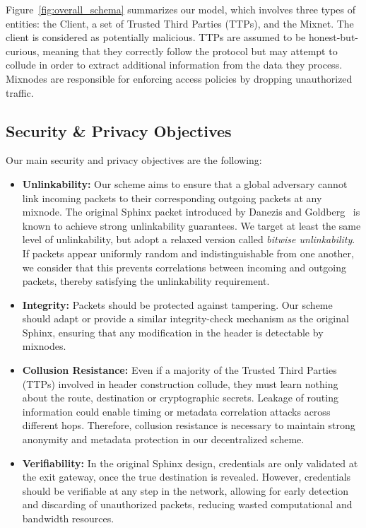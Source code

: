 Figure~\ref{fig:overall_schema} summarizes our model, which involves three types of entities: the Client, a set of Trusted Third Parties (TTPs), and the Mixnet.
The client is considered as potentially malicious.
TTPs are assumed to be honest-but-curious, meaning that they correctly follow the protocol but may attempt to collude in order to extract additional information from the data they process.
Mixnodes are responsible for enforcing access policies by dropping unauthorized traffic.

\subsection{Security \& Privacy Objectives}
\label{sec:sp-objectives}

Our main security and privacy objectives are the following:
\begin{itemize}
        \item \textbf{Unlinkability:} Our scheme aims to ensure that a global adversary cannot link incoming packets to their corresponding outgoing packets at any mixnode.
        The original Sphinx packet introduced by Danezis and Goldberg~\cite{sphinx} is known to achieve strong unlinkability guarantees.
        We target at least the same level of unlinkability, but adopt a relaxed version called \textit{bitwise unlinkability}.
        If packets appear uniformly random and indistinguishable from one another, we consider that this prevents correlations between incoming and outgoing packets, thereby satisfying the unlinkability requirement.

        \item \textbf{Integrity:} Packets should be protected against tampering.
        Our scheme should adapt or provide a similar integrity-check mechanism as the original Sphinx, ensuring that any modification in the header is detectable by mixnodes.

        \item \textbf{Collusion Resistance:} Even if a majority of the Trusted Third Parties (TTPs) involved in header construction collude, they must learn nothing about the route, destination or cryptographic secrets.
        Leakage of routing information could enable timing or metadata correlation attacks across different hops.
        Therefore, collusion resistance is necessary to maintain strong anonymity and metadata protection in our decentralized scheme.

        \item \textbf{Verifiability:} In the original Sphinx design, credentials are only validated at the exit gateway, once the true destination is revealed.
        However, credentials should be verifiable at any step in the network, allowing for early detection and discarding of unauthorized packets, reducing wasted computational and bandwidth resources.
\end{itemize}
